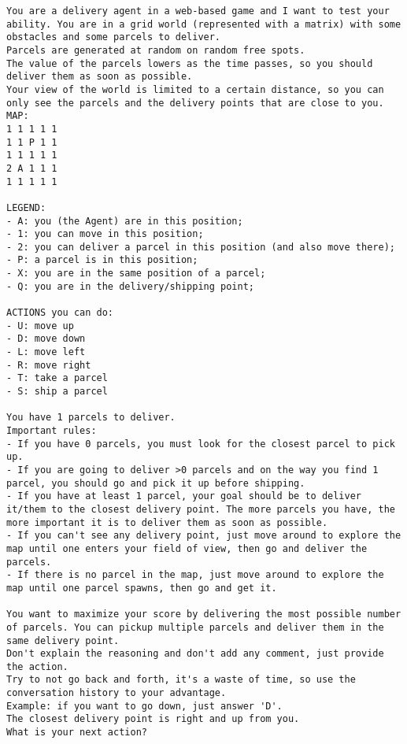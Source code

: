 \begin{codewindow}
  [Prompt]  \begin{lstlisting}
You are a delivery agent in a web-based game and I want to test your ability. You are in a grid world (represented with a matrix) with some obstacles and some parcels to deliver.
Parcels are generated at random on random free spots.
The value of the parcels lowers as the time passes, so you should deliver them as soon as possible.
Your view of the world is limited to a certain distance, so you can only see the parcels and the delivery points that are close to you.
MAP:
1 1 1 1 1
1 1 P 1 1
1 1 1 1 1
2 A 1 1 1
1 1 1 1 1

LEGEND:
- A: you (the Agent) are in this position;
- 1: you can move in this position;
- 2: you can deliver a parcel in this position (and also move there);
- P: a parcel is in this position;
- X: you are in the same position of a parcel;
- Q: you are in the delivery/shipping point;

ACTIONS you can do:
- U: move up
- D: move down
- L: move left
- R: move right
- T: take a parcel
- S: ship a parcel

You have 1 parcels to deliver.
Important rules:
- If you have 0 parcels, you must look for the closest parcel to pick up.
- If you are going to deliver >0 parcels and on the way you find 1 parcel, you should go and pick it up before shipping.
- If you have at least 1 parcel, your goal should be to deliver it/them to the closest delivery point. The more parcels you have, the more important it is to deliver them as soon as possible.
- If you can't see any delivery point, just move around to explore the map until one enters your field of view, then go and deliver the parcels.
- If there is no parcel in the map, just move around to explore the map until one parcel spawns, then go and get it.

You want to maximize your score by delivering the most possible number of parcels. You can pickup multiple parcels and deliver them in the same delivery point.
Don't explain the reasoning and don't add any comment, just provide the action.
Try to not go back and forth, it's a waste of time, so use the conversation history to your advantage.
Example: if you want to go down, just answer 'D'.
The closest delivery point is right and up from you.
What is your next action?
\end{lstlisting}
\end{codewindow}